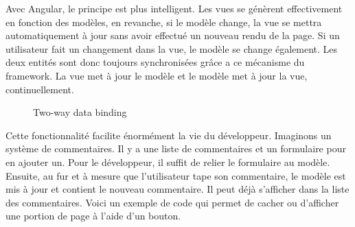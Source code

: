 \documentclass[letterpaper,10pt,oneside]{sphinxmanual}
\begin{document}
Avec Angular, le principe est plus intelligent. Les vues se génèrent effectivement en fonction des modèles, en revanche, si le modèle change, la vue se mettra automatiquement à jour sans avoir effectué un nouveau rendu de la page. Si un utilisateur fait un changement dans la vue, le modèle se change également. Les deux entités sont donc toujours synchronisées grâce a ce mécanisme du framework. La vue met à jour le modèle et le modèle met à jour la vue, continuellement.
\begin{figure}[htbp]
\centering
\capstart

\caption{Two-way data binding}\end{figure}

Cette fonctionnalité facilite énormément la vie du développeur. Imaginons un système de commentaires. Il y a une liste de commentaires et un formulaire pour en ajouter un. Pour le développeur, il suffit de relier le formulaire au modèle. Ensuite, au fur et à mesure que l'utilisateur tape son commentaire, le modèle est mis à jour et contient le nouveau commentaire. Il peut déjà s'afficher dans la liste des commentaires. Voici un exemple de code qui permet de cacher ou d'afficher une portion de page à l'aide d'un bouton.
\end{document}
